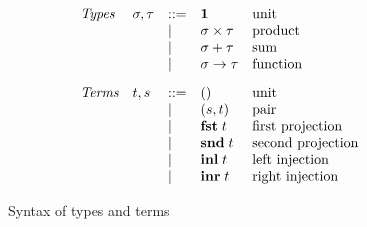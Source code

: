 \begin{figure}
  \small
  \[
  \begin{array}{lllll}
    \textit{Types} &
    \sigma, \tau
    & ::= &
    \mathbf{1}
    &
    \text{unit}
    \\
    && | &
    \sigma \times \tau
    &
    \text{product}
    \\
    && | &
    \sigma + \tau
    &
    \text{sum}
    \\
    && | &
    \sigma \to \tau
    &
    \text{function}
    \\[3mm]
    \textit{Terms} &
    t, s
    & ::= &
    ()
    &
    \text{unit}
    \\
    && | &
    (s,t)
    &
    \text{pair}
    \\
    && | &
    \mathbf{fst}\;t
    &
    \text{first projection}
    \\
    && | &
    \mathbf{snd}\;t
    &
    \text{second projection}
    \\
    && | &
    \mathbf{inl}\;t
    &
    \text{left injection}
    \\
    && | &
    \mathbf{inr}\;t
    &
    \text{right injection}
    \\
  \end{array}
  \]
  \caption{Syntax of types and terms }
\end{figure}
